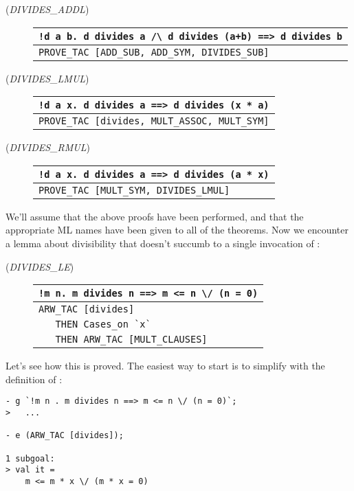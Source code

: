 \begin{description}
\item[\small{({\it DIVIDES\_ADDL\/})}]
\begin{tabular}[t]{l}
\verb|!d a b. d divides a /\ d divides (a+b) ==> d divides b| \\ \hline
 \verb+PROVE_TAC [ADD_SUB, ADD_SYM, DIVIDES_SUB]+ \\
\end{tabular}

\item[\small{({\it DIVIDES\_LMUL\/})}]
\begin{tabular}[t]{l}
\verb+!d a x. d divides a ==> d divides (x * a)+ \\ \hline
 \verb+PROVE_TAC [divides, MULT_ASSOC, MULT_SYM]+ \\
\end{tabular}

\item[\small{({\it DIVIDES\_RMUL\/})}]
\begin{tabular}[t]{l}
\verb+!d a x. d divides a ==> d divides (a * x)+ \\ \hline
 \verb+PROVE_TAC [MULT_SYM, DIVIDES_LMUL]+ \\
\end{tabular}

\end{description}

\noindent We'll assume that the above proofs have been performed, and
that the appropriate ML names have been given to all of the theorems.
Now we encounter a lemma about divisibility that doesn't succumb to a
single invocation of :
\begin{description}
\item [\small{({\it DIVIDES\_LE\/})}]
\begin{tabular}[t]{l}
\verb+!m n. m divides n ==> m <= n \/ (n = 0)+ \\ \hline
\verb+ARW_TAC [divides]+ \\
\verb+   THEN Cases_on `x`+ \\
\verb+   THEN ARW_TAC [MULT_CLAUSES]+ \\
\end{tabular}
\end{description}
Let's see how this is proved. The easiest way to start is to simplify
with the definition of :
\begin{session}\begin{verbatim}
- g `!m n . m divides n ==> m <= n \/ (n = 0)`;
>   ...

- e (ARW_TAC [divides]);

1 subgoal:
> val it =
    m <= m * x \/ (m * x = 0)
\end{verbatim}\end{session}

